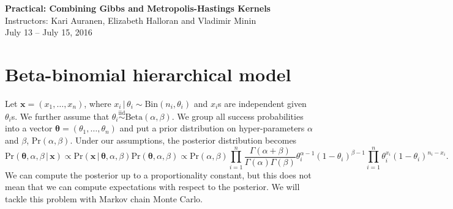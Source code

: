 \documentclass[11pt]{article}
\newcommand{\cprob}[2]{\ensuremath{\text{Pr}\left(#1 \,|\,#2\right)}}
\newcommand{\prob}[1]{\ensuremath{\text{Pr}\left(#1 \right)}}
\newcommand{\iid}{\ensuremath{\overset{\text{iid}}{\sim}}}
\theoremstyle{remark}
\theoremstyle{definition}
\numberwithin{equation}{section}
\numberwithin{figure}{section}
\begin{document}


\begin{center}
  \textbf{\Large Practical: Combining Gibbs and Metropolis-Hastings Kernels}\\
  {\large Instructors: Kari Auranen, Elizabeth Halloran and Vladimir Minin}\\
  {\large July 13 -- July 15, 2016}
\end{center}

\section{Beta-binomial hierarchical model}
  Let $\mathbf{x} = (x_1,\dots,x_n)$, where $x_i\,|\,\theta_i \sim \text{Bin}(n_i,\theta_i)$ and $x_i$s are 
  independent given $\theta_i$s. We further assume that $\theta_i \iid \text{Beta}(\alpha,\beta)$. We group
  all success probabilities into a vector $\boldsymbol{\theta} = (\theta_1,\dots,\theta_n)$ and put 
  a prior distribution on hyper-parameters $\alpha$ and $\beta$, $\prob{\alpha,\beta}$. Under our assumptions,
  the posterior distribution becomes
  \[
  \cprob{\boldsymbol{\theta}, \alpha, \beta}{\mathbf{x}} \propto 
  \cprob{\mathbf{x}}{\boldsymbol{\theta},\alpha,\beta}\prob{\boldsymbol{\theta}, \alpha, \beta} \propto
  \prob{\alpha,\beta} \prod_{i=1}^n \frac{\Gamma(\alpha+\beta)}{\Gamma(\alpha)\Gamma(\beta)} \theta_i^{\alpha-1}
  (1-\theta_i)^{\beta -1} \prod_{i=1}^n \theta_i^{x_i} (1-\theta_i)^{n_i-x_i}.
  \]
  We can compute the posterior up to a proportionality constant, but this does not mean that we can compute
  expectations with respect to the posterior. We will tackle this problem with Markov chain Monte Carlo.
\end{document}
